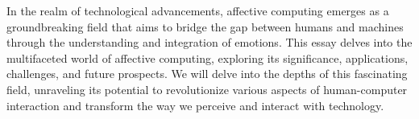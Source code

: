 In the realm of technological advancements, 
affective computing emerges as a groundbreaking field that aims to bridge the gap between humans and 
machines through the understanding and integration of emotions. This essay delves into the multifaceted world of affective computing, 
exploring its significance, applications, challenges, and future prospects. 
We will delve into the depths of this fascinating field, unraveling its potential to revolutionize various aspects of human-computer 
interaction and transform the way we perceive and interact with technology.